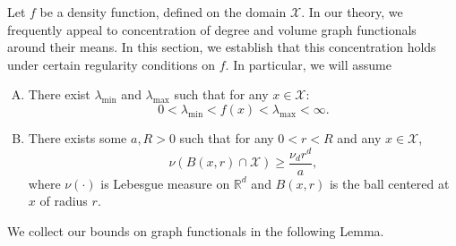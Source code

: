 \documentclass[11pt,twoside]{article}
\newcommand{\Reals}{\mathbb{R}}
\newcommand{\1}{\mathbf{1}}
\begin{document}
Let $f$ be a density function, defined on the domain $\mathcal{X}$. In our theory, we frequently appeal to concentration of degree and volume graph functionals around their means. In this section, we establish that this concentration holds under certain regularity conditions on $f$. In particular, we will assume
\begin{enumerate}[(A)]
	\item 
	\label{asmp:regularity_condition_1}
	There exist $\lambda_{\min}$ and $\lambda_{\max}$ such that for any $x \in \mathcal{X}$:
	\begin{equation*}
	0 < \lambda_{\min} < f(x) < \lambda_{\max} < \infty.
	\end{equation*}
	\item
	\label{asmp:regularity_condition_2}
	There exists some $a,R > 0$ such that for any $0 < r < R$ and any $x \in \mathcal{X}$,
	\begin{equation*}
	\nu(B(x,r) \cap \mathcal{X}) \geq \frac{\nu_d r^d}{a},
	\end{equation*}
	where $\nu(\cdot)$ is Lebesgue measure on $\Reals^d$ and $B(x,r)$ is the ball centered at $x$ of radius $r$. 
\end{enumerate}
We collect our bounds on graph functionals in the following Lemma. 
\end{document}
